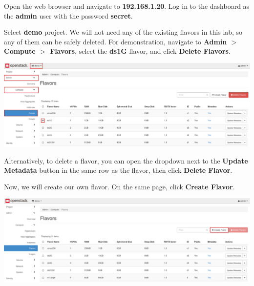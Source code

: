 \documentclass[letterpaper, 12pt]{article}
\begin{document}
\begin{enumerate}
    \begin{labstep}
        Open the web browser and navigate to \textbf{192.168.1.20}.
        Log in to the dashboard as the \textbf{admin} user with the password \textbf{secret}.
    \end{labstep}

    \begin{labstep}
        Select \textbf{demo} project.
        We will not need any of the existing flavors in this lab, so any of them can be safely deleted.
        For demonstration, navigate to \textbf{Admin $>$ Compute $>$ Flavors}, select the \textbf{ds1G} flavor, and click \textbf{Delete Flavors}.

        \begin{center}
            \includegraphics[width=\linewidth]{images/part2/step2.png}
        \end{center}
    \end{labstep}

    \begin{tipbox}
        Alternatively, to delete a flavor, you can open the dropdown next to the \textbf{Update Metadata} button in the same row as the flavor, then click \textbf{Delete Flavor}.
    \end{tipbox}

    \begin{labstep}
        Now, we will create our own flavor.
        On the same page, click \textbf{Create Flavor}.

        \begin{center}
            \includegraphics[width=\linewidth]{images/part2/step3.png}
        \end{center}
    \end{labstep}


\end{enumerate}
\end{document}
